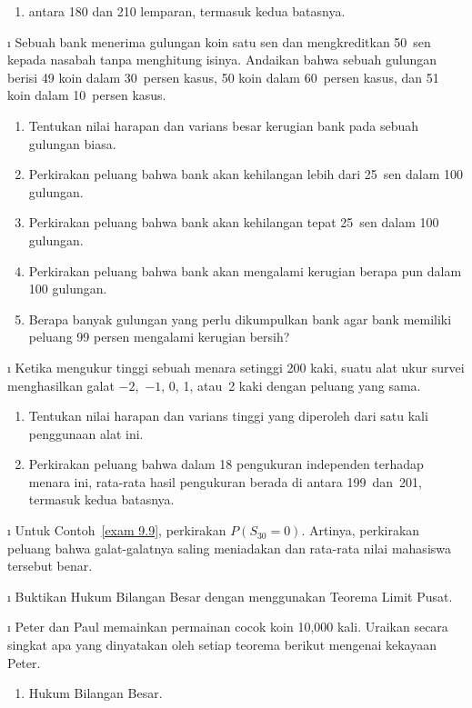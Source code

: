 \begin{LJSItem}
\begin{enumerate}
\item  antara 180 dan 210 lemparan, termasuk kedua batasnya.
\end{enumerate}

\i\label{exer 9.2.105}  Sebuah bank menerima gulungan koin satu sen dan mengkreditkan 50~sen kepada
nasabah tanpa menghitung isinya.  Andaikan bahwa sebuah gulungan berisi 49 koin dalam
30~persen kasus, 50 koin dalam 60~persen kasus, dan 51 koin dalam 10~persen kasus.
\begin{enumerate}
\item  Tentukan nilai harapan dan varians besar kerugian bank pada sebuah gulungan biasa.

\item  Perkirakan peluang bahwa bank akan kehilangan lebih dari 25~sen dalam 100 gulungan.

\item  Perkirakan peluang bahwa bank akan kehilangan tepat 25~sen dalam 100 gulungan.

\item  Perkirakan peluang bahwa bank akan mengalami kerugian berapa pun dalam 100 gulungan.

\item  Berapa banyak gulungan yang perlu dikumpulkan bank agar bank memiliki peluang 99 persen
mengalami kerugian bersih?
\end{enumerate}

\i\label{exer 9.2.106}  Ketika mengukur tinggi sebuah menara setinggi 200 kaki, suatu alat ukur
survei menghasilkan galat $-2$,~$-1$, 0, 1, atau~2 kaki dengan peluang yang sama.
\begin{enumerate}
\item  Tentukan nilai harapan dan varians tinggi yang diperoleh dari satu kali penggunaan alat ini.

\item  Perkirakan peluang bahwa dalam 18 pengukuran independen terhadap menara ini, rata-rata hasil
pengukuran berada di antara 199~dan~201, termasuk kedua batasnya.
\end{enumerate}

\i\label{exer 9.2.107}  Untuk Contoh~\ref{exam 9.9}, perkirakan $P(S_{30} = 0)$.  Artinya,
perkirakan peluang bahwa galat-galatnya saling meniadakan dan rata-rata nilai mahasiswa tersebut
benar.

\i\label{exer 9.2.108}  Buktikan Hukum Bilangan Besar dengan menggunakan Teorema Limit Pusat.

\i\label{exer 9.2.109}  Peter dan Paul memainkan permainan cocok koin 10{,}000 kali.  Uraikan
secara singkat apa yang dinyatakan oleh setiap teorema berikut mengenai kekayaan Peter.
\begin{enumerate}
\item  Hukum Bilangan Besar.


\end{enumerate}
\end{LJSItem}
